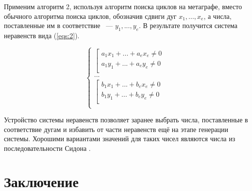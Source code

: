 \documentclass[14pt]{mmcs_article}
\begin{document}
Применим алгоритм 2, используя алгоритм поиска циклов на метаграфе, вместо обычного алгоритма поиска циклов, обозначив сдвиги дуг $x_1, ..., x_e$, а числа, поставленные им в соответствие ~--- $y_1, ..., y_e$. В результате получится система неравенств вида (\ref{eqs:2}).

\begin{equation}
  \left\{
    \begin{array}{ll}
        \left[  
          \begin{array}{ll}
              a_1 x_1 + ... + a_e x_e \neq 0 \\
              a_1 y_1 + ... + a_e y_e \neq 0 \\
          \end{array}
        \right.\\
        ...\\
        \left[  
          \begin{array}{ll}
              b_1 x_1 + ... + b_e x_e \neq 0 \\
              b_1 y_1 + ... + b_e y_e \neq 0 \\
          \end{array}
        \right.\\
    \end{array}
  \right.
  \label{eqs:2}
\end{equation}

Устройство системы неравенств позволяет заранее выбрать числа, поставленные в соответствие дугам и избавить от части неравенств ещё на этапе генерации системы. Хорошими вариантами значений для таких чисел являются числа из последовательности Сидона \cite{sidon}.

\newpage
{}
\section*{Заключение}



\newpage

\renewcommand{\refname}{\centering \textbf{Литература}}
\end{document}
